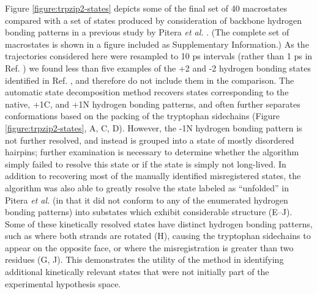 Figure \ref{figure:trpzip2-states} depicts some of the final set of 40 macrostates compared with a set of states produced by consideration of backbone hydrogen bonding patterns in a previous study by Pitera \emph{et al.} \cite{pitera:2006a}.
(The complete set of macrostates is shown in a figure included as Supplementary Information.)
As the trajectories considered here were resampled to 10 ps intervals (rather than 1 ps in Ref. \cite{pitera:2006a}) we found less than five examples of the +2 and -2 hydrogen bonding states identified in Ref. \cite{pitera:2006a}, and therefore do not include them in the comparison.
The automatic state decomposition method recovers states corresponding to the native, +1C, and +1N hydrogen bonding patterns, and often further separates conformations based on the packing of the tryptophan sidechains (Figure \ref{figure:trpzip2-states}, A, C, D).
However, the -1N hydrogen bonding pattern is not further resolved, and instead is grouped into a state of mostly disordered hairpins; further examination is necessary to determine whether the algorithm simply failed to resolve this state or if the state is simply not long-lived.
In addition to recovering most of the manually identified misregistered states, the algorithm was also able to greatly resolve the state labeled as ``unfolded'' in Pitera \emph{et al.} (in that it did not conform to any of the enumerated hydrogen bonding patterns) into substates which exhibit considerable structure (E--J).
Some of these kinetically resolved states have distinct hydrogen bonding patterns, such as where both strands are rotated (H), causing the tryptophan sidechains to appear on the opposite face, or where the misregistration is greater than two residues (G, J). 
This demonstrates the utility of the method in identifying additional kinetically relevant states that were not initially part of the experimental hypothesis space.

